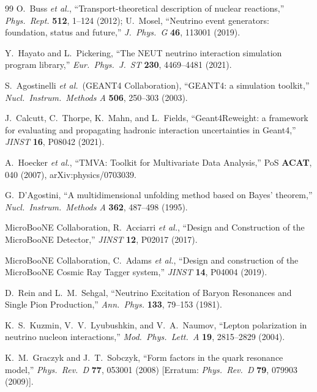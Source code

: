 \documentclass[11pt,a4paper]{article}
\begin{document}
\begin{thebibliography}{99}
  O.~Buss \textit{et al.},
  ``Transport-theoretical description of nuclear reactions,''
  \textit{Phys.\ Rept.} \textbf{512}, 1--124 (2012);
  U.~Mosel, ``Neutrino event generators: foundation, status and future,''
  \textit{J.\ Phys.\ G} \textbf{46}, 113001 (2019).

  Y.~Hayato and L.~Pickering,
  ``The NEUT neutrino interaction simulation program library,''
  \textit{Eur.\ Phys.\ J.\ ST} \textbf{230}, 4469--4481 (2021).

  S.~Agostinelli \textit{et al.}\ (GEANT4 Collaboration),
  ``GEANT4: a simulation toolkit,''
  \textit{Nucl.\ Instrum.\ Methods A} \textbf{506}, 250--303 (2003).

  J.~Calcutt, C.~Thorpe, K.~Mahn, and L.~Fields,
  ``Geant4Reweight: a framework for evaluating and propagating hadronic
  interaction uncertainties in Geant4,''
  \textit{JINST} \textbf{16}, P08042 (2021).

  A.~Hoecker \textit{et al.},
  ``TMVA: Toolkit for Multivariate Data Analysis,''
  PoS \textbf{ACAT}, 040 (2007), arXiv:physics/0703039.

  G.~D'Agostini,
  ``A multidimensional unfolding method based on Bayes' theorem,''
  \textit{Nucl.\ Instrum.\ Methods A} \textbf{362}, 487--498 (1995).

  MicroBooNE Collaboration, R.~Acciarri \textit{et al.},
  ``Design and Construction of the MicroBooNE Detector,''
  \textit{JINST} \textbf{12}, P02017 (2017).

  MicroBooNE Collaboration, C.~Adams \textit{et al.},
  ``Design and construction of the MicroBooNE Cosmic Ray Tagger system,''
  \textit{JINST} \textbf{14}, P04004 (2019).

  D.~Rein and L.~M.~Sehgal,
  ``Neutrino Excitation of Baryon Resonances and Single Pion Production,''
  \textit{Ann.\ Phys.} \textbf{133}, 79--153 (1981).

  K.~S.~Kuzmin, V.~V.~Lyubushkin, and V.~A.~Naumov,
  ``Lepton polarization in neutrino nucleon interactions,''
  \textit{Mod.\ Phys.\ Lett.\ A} \textbf{19}, 2815--2829 (2004).

  K.~M.~Graczyk and J.~T.~Sobczyk,
  ``Form factors in the quark resonance model,''
  \textit{Phys.\ Rev.\ D} \textbf{77}, 053001 (2008)
  [Erratum: \textit{Phys.\ Rev.\ D} \textbf{79}, 079903 (2009)].


\end{thebibliography}
\end{document}
